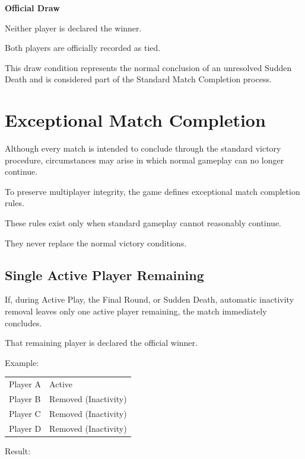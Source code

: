 \documentclass[11pt,a4paper]{article}
\begin{document}
\begin{center}
\Large\textbf{Official Draw}
\end{center}

Neither player is declared the winner.

Both players are officially recorded as tied.

This draw condition represents the normal conclusion of an unresolved Sudden Death and is considered part of the Standard Match Completion process.

\section{Exceptional Match Completion}

Although every match is intended to conclude through the standard victory procedure, circumstances may arise in which normal gameplay can no longer continue.

To preserve multiplayer integrity, the game defines exceptional match completion rules.

These rules exist only when standard gameplay cannot reasonably continue.

They never replace the normal victory conditions.

\subsection{Single Active Player Remaining}

If, during Active Play, the Final Round, or Sudden Death, automatic inactivity removal leaves only one active player remaining, the match immediately concludes.

That remaining player is declared the official winner.

Example:

\begin{center}
\begin{tabular}{ll}
Player A & Active\\
Player B & Removed (Inactivity)\\
Player C & Removed (Inactivity)\\
Player D & Removed (Inactivity)\\
\end{tabular}
\end{center}

Result:
\end{document}
